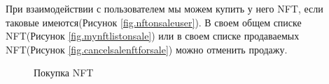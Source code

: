 При взаимодействии с пользователем мы можем купить у него NFT, если таковые имеются(Рисунок {\color{blue} \ref{fig.nftonsaleuser}}). В своем общем списке NFT(Рисунок {\color{blue} \ref{fig.mynftlistonsale}})  или в своем списке продаваемых NFT(Рисунок {\color{blue} \ref{fig.cancelsalenftforsale}}) можно отменить продажу.

\begin{figure}[H]
    \centering
    \caption{Покупка NFT}
\end{figure}

